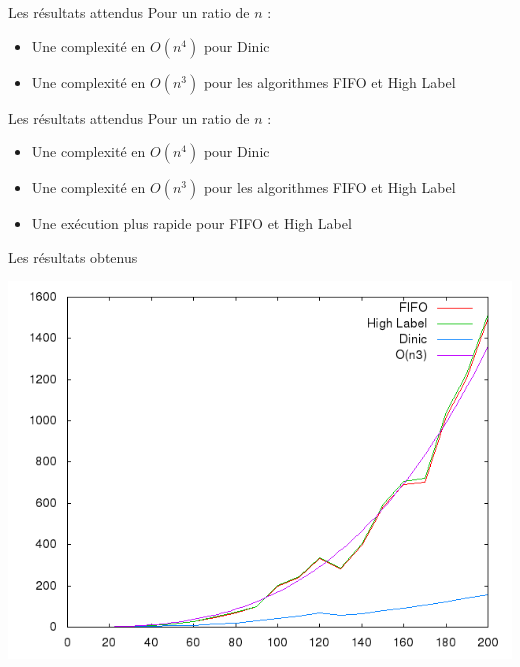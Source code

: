 \documentclass[hyperref={},
xcolor={dvipsnames,svgnames,table},10pt]{beamer}
\begin{document}
\begin{frame}{Les résultats attendus}
	Pour un ratio de $n$ : \begin{itemize}
		\item Une complexité en $O(n^4)$ pour Dinic
		\item Une complexité en $O(n^3)$ pour les algorithmes FIFO et High Label
	\end{itemize}
\end{frame}

\begin{frame}{Les résultats attendus}
	Pour un ratio de $n$ : \begin{itemize}
		\item Une complexité en $O(n^4)$ pour Dinic
		\item Une complexité en $O(n^3)$ pour les algorithmes FIFO et High Label
		\item Une exécution plus rapide pour FIFO et High Label
	\end{itemize}
\end{frame}

\begin{frame}{Les résultats obtenus}
	\begin{minipage}[c]{0.50\linewidth}
		\includegraphics[scale=0.3]{img/resultat.png}
	\end{minipage}\hfill
	\begin{minipage}[c]{0.40\linewidth}
	\end{minipage}
\end{frame}
\end{document}
